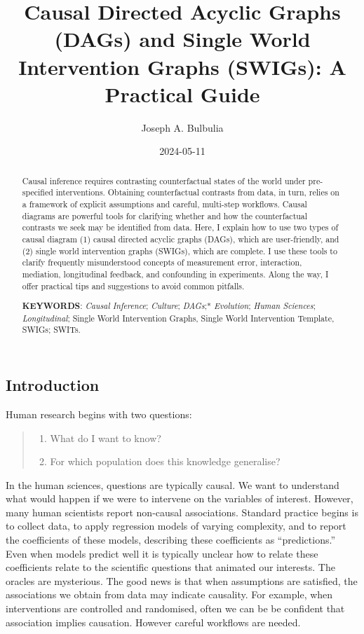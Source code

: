 \documentclass[
  single column]{article}
\title{Causal Directed Acyclic Graphs (DAGs) and Single World
Intervention Graphs (SWIGs): A Practical Guide}
\author{Joseph A. Bulbulia}
\affil{%
             \small{     Victoria University of Wellington, New Zealand
          ORCID \textcolor[HTML]{A6CE39}{\aiOrcid} ~0000-0002-5861-2056 }
              }
\date{2024-05-11}
\providecommand{\tightlist}{%
  \setlength{\itemsep}{0pt}\setlength{\parskip}{0pt}}\usepackage{longtable,booktabs,array}
\begin{document}
\maketitle
\begin{abstract}
Causal inference requires contrasting counterfactual states of the world
under pre-specified interventions. Obtaining counterfactual contrasts
from data, in turn, relies on a framework of explicit assumptions and
careful, multi-step workflows. Causal diagrams are powerful tools for
clarifying whether and how the counterfactual contrasts we seek may be
identified from data. Here, I explain how to use two types of causal
diagram (1) causal directed acyclic graphs (DAGs), which are
user-friendly, and (2) single world intervention graphs (SWIGs), which
are complete. I use these tools to clarify frequently misunderstood
concepts of measurement error, interaction, mediation, longitudinal
feedback, and confounding in experiments. Along the way, I offer
practical tips and suggestions to avoid common pitfalls.

\textbf{KEYWORDS}: \emph{Causal Inference}; \emph{Culture};
\emph{DAGs};* \emph{Evolution}; \emph{Human Sciences};
\emph{Longitudinal}; Single World Intervention Graphs, Single World
Intervention Template, SWIGs; SWITs.
\end{abstract}

\subsection{Introduction}\label{introduction}

Human research begins with two questions:

\begin{quote}
\begin{enumerate}
\def\labelenumi{\arabic{enumi}.}
\tightlist
\item
  What do I want to know?
\item
  For which population does this knowledge generalise?
\end{enumerate}
\end{quote}

In the human sciences, questions are typically causal. We want to
understand what would happen if we were to intervene on the variables of
interest. However, many human scientists report non-causal associations.
Standard practice begins is to collect data, to apply regression models
of varying complexity, and to report the coefficients of these models,
describing these coefficients as ``predictions.'' Even when models
predict well it is typically unclear how to relate these coefficients
relate to the scientific questions that animated our interests. The
oracles are mysterious. The good news is that when assumptions are
satisfied, the associations we obtain from data may indicate causality.
For example, when interventions are controlled and randomised, often we
can be be confident that association implies causation. However careful
workflows are needed.
\end{document}
